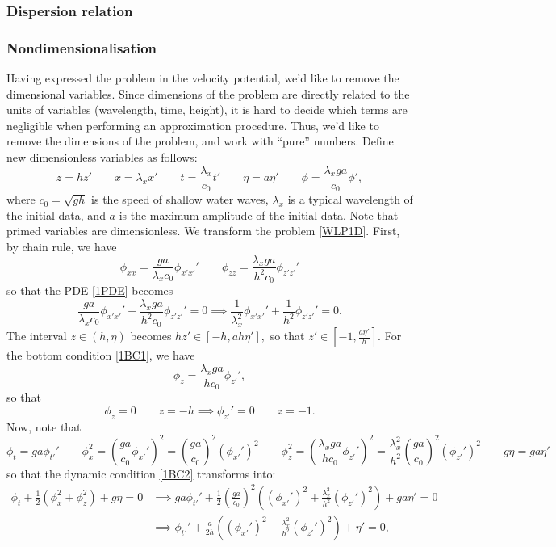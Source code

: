 \documentclass[10pt,reqno,oneside,a4paper]{article}
\begin{document}
\subsubsection{Dispersion relation}

\subsubsection{Nondimensionalisation}
Having expressed the problem in the velocity potential, we'd like to remove the dimensional variables. Since dimensions of the problem are directly related to the units of variables (wavelength, time, height), it is hard to decide which terms are negligible when performing an approximation procedure. Thus, we'd like to remove the dimensions of the problem, and work with ``pure'' numbers.  Define new dimensionless variables as follows:
\[ 
z = h z' \qquad x = \lambda_x x' \qquad t = \frac{\lambda_x}{c_0} t' \qquad \eta = a \eta' \qquad \phi  = \frac{\lambda_x ga}{c_0} \phi',
\]
where $c_0 = \sqrt{gh}$ is the speed of shallow water waves, $\lambda_x$ is a typical wavelength of the initial data, and $a$ is the maximum amplitude of the initial data. Note that primed variables are dimensionless. We transform the problem \eqref{WLP1D}.
First, by chain rule, we have
\[ 
\phi_{xx} = \frac{ga}{\lambda_x c_0} \phi_{x'x'}' \qquad \phi_{zz} = \frac{\lambda_x ga}{h^2c_0} \phi_{z'z'}'\] 
so that the PDE \eqref{1PDE} becomes
\[\frac{ga}{\lambda_x c_0} \phi_{x'x'}' + \frac{\lambda_x ga}{h^2c_0} \phi_{z'z'}' = 0 \implies \frac{1}{\lambda_x^2} \phi_{x'x'}' + \frac{1}{h^2} \phi_{z'z'}' = 0.
\]
The interval $z \in (h, \eta)$ becomes $hz' \in [-h, a h \eta'],$ so that $z' \in [-1, \frac{a \eta'}{h}].$ For the bottom condition \eqref{1BC1}, we have
\[ 
\phi_z =  \frac{\lambda_x ga}{h c_0} \phi_{z'}',
\]
so that 
\[ \phi_z = 0 \qquad z = - h \implies \phi_{z'}' = 0 \qquad z = -1. \]
Now, note that 
\[ 
\phi_t = ga \phi_{t'}' \qquad \phi_x^2 = \left(\frac{ga}{c_0} \phi_{x'}'\right)^2 = \left(\frac{ga}{c_0}\right)^2 \left(\phi_{x'}'\right)^2 \qquad \phi_z^2 = \left(\frac{\lambda_x ga}{hc_0}\phi_{z'}'\right)^2 = \frac{\lambda_x^2}{h^2}\left(\frac{ga}{c_0}\right)^2\left(\phi_{z'}'\right)^2 \qquad g\eta = ga\eta'
\]
so that the dynamic condition \eqref{1BC2} transforms into:
\begin{align*}
\phi_t + \frac{1}{2} (\phi_{x}^2 + \phi_{z}^2) + g \eta = 0 &\implies ga \phi_{t'}' + \frac{1}{2}\left(\frac{ga}{c_0}\right)^2 \left((\phi_{x'}')^2 + \frac{\lambda_x^2}{h^2}(\phi_{z'}')^2\right) + ga \eta' = 0 \\
&\implies \phi_{t'}' + \frac{a}{2h} \left((\phi_{x'}')^2 + \frac{\lambda_x^2}{h^2}(\phi_{z'}')^2\right) + \eta' = 0,
\end{align*}
\end{document}

